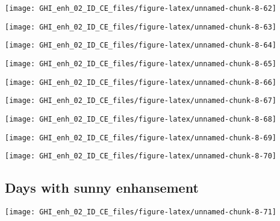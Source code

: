 \documentclass[
  10pt,
  a4paper,oneside]{article}
\begin{document}
\begin{center}\texttt{[image: GHI\_enh\_02\_ID\_CE\_files/figure-latex/unnamed-chunk-8-62]} \end{center}

\begin{center}\texttt{[image: GHI\_enh\_02\_ID\_CE\_files/figure-latex/unnamed-chunk-8-63]} \end{center}

\begin{center}\texttt{[image: GHI\_enh\_02\_ID\_CE\_files/figure-latex/unnamed-chunk-8-64]} \end{center}

\begin{center}\texttt{[image: GHI\_enh\_02\_ID\_CE\_files/figure-latex/unnamed-chunk-8-65]} \end{center}

\begin{center}\texttt{[image: GHI\_enh\_02\_ID\_CE\_files/figure-latex/unnamed-chunk-8-66]} \end{center}

\begin{center}\texttt{[image: GHI\_enh\_02\_ID\_CE\_files/figure-latex/unnamed-chunk-8-67]} \end{center}

\begin{center}\texttt{[image: GHI\_enh\_02\_ID\_CE\_files/figure-latex/unnamed-chunk-8-68]} \end{center}

\begin{center}\texttt{[image: GHI\_enh\_02\_ID\_CE\_files/figure-latex/unnamed-chunk-8-69]} \end{center}

\begin{center}\texttt{[image: GHI\_enh\_02\_ID\_CE\_files/figure-latex/unnamed-chunk-8-70]} \end{center}

\FloatBarrier

\hypertarget{days-with-sunny-enhansement}{%
\subsection{Days with sunny enhansement}\label{days-with-sunny-enhansement}}

\begin{center}\texttt{[image: GHI\_enh\_02\_ID\_CE\_files/figure-latex/unnamed-chunk-8-71]} \end{center}
\end{document}
